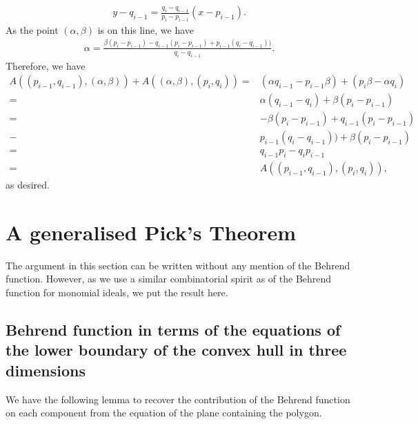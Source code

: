 \documentclass[11pt,a4paper,leqno,noamsfonts]{amsart}
\numberwithin{equation}{section}
\begin{document}
  \begin{align*}
      y-q_{i-1}=\frac{q_{i}-q_{i-1}}{p_{i}-p_{i-1}}(x-p_{i-1}).
  \end{align*}
  As the point $(\alpha,\beta)$ is on this line, we have
  \begin{align*}
       \alpha=\frac{\beta(p_{i}-p_{i-1})-q_{i-1}(p_{i}-p_{i-1})+p_{i-1}(q_{i}-q_{i-1}))}{q_{i}-q_{i-1}}.
  \end{align*}
 Therefore, we have
  \begin{align*}
  A((p_{i-1},q_{i-1}),(\alpha,\beta))+A((\alpha,\beta),(p_i,q_i))=&(\alpha q_{i-1}-p_{i-1}\beta)+(p_{i}\beta-\alpha q_{i})\\
  =&\alpha(q_{i-1}-q_{i})+\beta(p_{i}-p_{i-1}) \\
  =&-\beta(p_{i}-p_{i-1})+q_{i-1}(p_{i}-p_{i-1})\\-&p_{i-1}(q_{i}-q_{i-1}))+\beta(p_{i}-p_{i-1})\\
  =&q_{i-1}p_i-q_ip_{i-1}\\
      =& A((p_{i-1},q_{i-1}),(p_i,q_i)),
  \end{align*}
as desired.













\appendix



\section{A generalised Pick's Theorem}
The argument in this section can be written without any mention of the Behrend function. However, as we use a similar combinatorial spirit as of the Behrend function for monomial ideals, we put the result here.
\subsection{Behrend function in terms of the equations of the lower boundary of the convex hull in three dimensions} We have the following lemma to recover the contribution of the Behrend function on each component from the equation of the plane containing the polygon.
\end{document}
